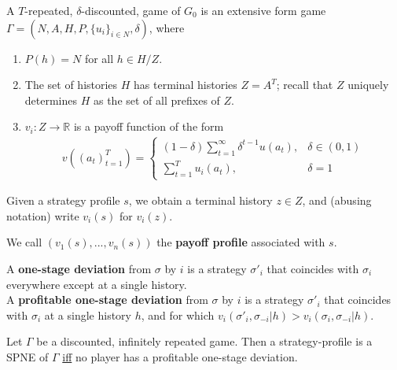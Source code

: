 \documentclass[11pt]{elegantbook}
\begin{document}
\begin{definition}
    \normalfont
    A $T$-repeated, $\delta$-discounted, game of $G_0$ is an extensive form game $\Gamma=\left(N,A,H,P,\{u_i\}_{i\in N},\delta\right)$, where
    \begin{enumerate}
        \item $P(h)=N$ for all $h\in H/Z$.
        \item The set of histories $H$ has terminal histories $Z=A^T$; recall that $Z$
        uniquely determines $H$ as the set of all prefixes of $Z$.
        \item $v_i:Z \rightarrow \mathbb{R}$ is a payoff function of the form
        \begin{equation}
            \begin{aligned}
                v((a_t)_{t=1}^T)=\left\{\begin{matrix}
                    (1-\delta)\sum_{t=1}^\infty \delta^{t-1}u(a_t),&\delta\in(0,1)\\
                    \sum_{t=1}^T u_i(a_t),&\delta=1
                \end{matrix}\right.
            \end{aligned}
            \nonumber
        \end{equation}
    \end{enumerate}
\end{definition}
Given a strategy profile $s$, we obtain a terminal history $z \in Z$, and (abusing notation) write $v_i(s)$ for $v_i(z)$.

We call $(v_1(s),...,v_n(s))$ the \textbf{payoff profile} associated with $s$.


\begin{definition}
    \normalfont
    A \textbf{one-stage deviation} from $\sigma$ by $i$ is a strategy $\sigma'_i$ that coincides with $\sigma_i$ everywhere except at a single history.\\
    A \textbf{profitable one-stage deviation} from $\sigma$ by $i$ is a strategy $\sigma'_i$ that coincides with $\sigma_i$ at a single history $h$, and for which $v_i(\sigma'_i,\sigma_{-i}|h)>v_i(\sigma_i,\sigma_{-i}|h)$.
\end{definition}

\begin{proposition}
    Let $\Gamma$ be a discounted, infinitely repeated game. Then a strategy-profile is a SPNE of $\Gamma$ \underline{iff} no player has a profitable one-stage deviation.
\end{proposition}
\end{document}
